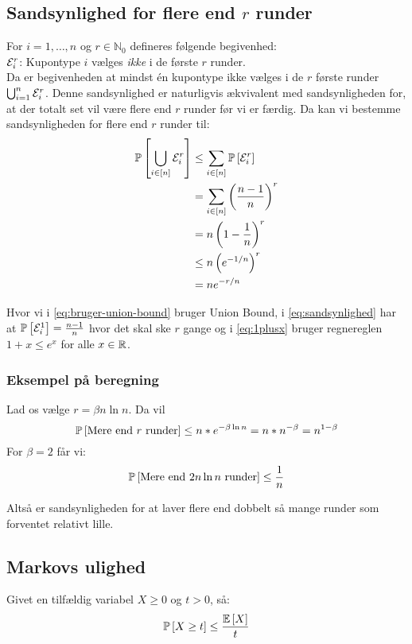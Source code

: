 \subsection{Sandsynlighed for flere end $r$ runder}
For $i = 1, \dots, n$ og $r \in \mathbb{N}_0$ defineres følgende begivenhed:\\
$\event_i^r$: Kupontype $i$ vælges \emph{ikke} i de første $r$ runder.\\

Da er begivenheden at mindst én kupontype ikke vælges i de $r$ første runder $\bigcup_{i=1}^n \event_i^r$. Denne sandsynlighed er naturligvis ækvivalent med sandsynligheden for, at der totalt set vil være flere end $r$ runder før vi er færdig. Da kan vi bestemme sandsynligheden for flere end $r$ runder til:
\begin{align}
  \P{\bigcup_{i \in [n]} \event_i^r}
  &\leq \sum_{i \in [n]} \P{\event_i^r} \label{eq:bruger-union-bound} \\
  &= \sum_{i \in [n]} \pfrac{n-1}{n}^r \label{eq:sandsynlighed} \\
  &= n \p{1 - \frac{1}{n}}^r \nonumber \\
  &\leq n \p{e^{-1/n}}^r \label{eq:1plusx}\\
  &= n e^{-r/n} \nonumber
\end{align}

Hvor vi i \cref{eq:bruger-union-bound} bruger Union Bound, i \cref{eq:sandsynlighed} har at $\P{\event_i^1} = \frac{n-1}{n}$ hvor det skal ske $r$ gange og i \cref{eq:1plusx} bruger regnereglen $1 + x \leq e^x$ for alle $x \in \R$.


\subsubsection{Eksempel på beregning}
Lad os vælge $r = \beta n \ln n$. Da vil
$$
  \P{\text{Mere end $r$ runder}} \leq n * e^{- \beta \ln n} = n * n^{- \beta} = n^{1 - \beta}
$$
For $\beta = 2$ får vi:
$$
  \P{\text{Mere end $2 n \ln n$ runder}} \leq \frac{1}{n}
$$

Altså er sandsynligheden for at laver flere end dobbelt så mange runder som forventet relativt lille.


\newpage
\subsection{Markovs ulighed}
Givet en tilfældig variabel $X \geq 0$ og $t > 0$, så:
\begin{align}
  \P{X \geq t} \leq \frac{\E{X}}{t} \label{eq:markov}
\end{align}

